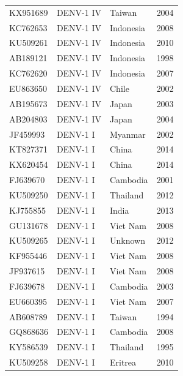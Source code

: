 \begin{longtable}{@{}llll@{}}
KX951689 & DENV-1 IV           & Taiwan      & 2004            \\
KC762653 & DENV-1 IV           & Indonesia   & 2008            \\
KU509261 & DENV-1 IV           & Indonesia   & 2010            \\
AB189121 & DENV-1 IV           & Indonesia   & 1998            \\
KC762620 & DENV-1 IV           & Indonesia   & 2007            \\
EU863650 & DENV-1 IV           & Chile       & 2002            \\
AB195673 & DENV-1 IV           & Japan       & 2003            \\
AB204803 & DENV-1 IV           & Japan       & 2004            \\
JF459993 & DENV-1 I            & Myanmar     & 2002            \\
KT827371 & DENV-1 I            & China       & 2014            \\
KX620454 & DENV-1 I            & China       & 2014            \\
FJ639670 & DENV-1 I            & Cambodia    & 2001            \\
KU509250 & DENV-1 I            & Thailand    & 2012            \\
KJ755855 & DENV-1 I            & India       & 2013            \\
GU131678 & DENV-1 I            & Viet Nam    & 2008            \\
KU509265 & DENV-1 I            & Unknown     & 2012            \\
KF955446 & DENV-1 I            & Viet Nam    & 2008            \\
JF937615 & DENV-1 I            & Viet Nam    & 2008            \\
FJ639678 & DENV-1 I            & Cambodia    & 2003            \\
EU660395 & DENV-1 I            & Viet Nam    & 2007            \\
AB608789 & DENV-1 I            & Taiwan      & 1994            \\
GQ868636 & DENV-1 I            & Cambodia    & 2008            \\
KY586539 & DENV-1 I            & Thailand    & 1995            \\
KU509258 & DENV-1 I            & Eritrea     & 2010           
\end{longtable}


